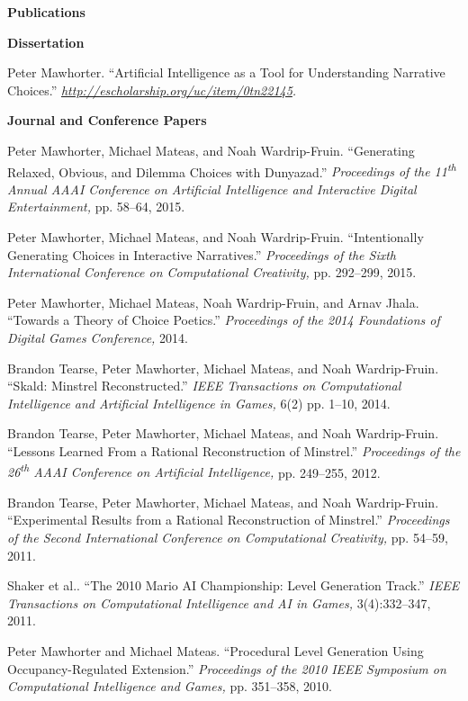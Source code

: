 \documentclass[11pt]{article}
\newenvironment{pubs}[1]{%
  \vspace{8pt}\textbf{\Large #1} \hrulefill\vspace{6pt}
  \begin{adjustwidth}{14pt}{0pt}
  \setlength{\parskip}{4pt}
  \setlength{\parindent}{-8pt}
}{%
  \end{adjustwidth}
}
\newcommand{\pub}[3]{#1. ``#2.'' \textit{#3.}}
\newcommand{\fullpub}[5]{#1. ``#2.'' \textit{#3,} #4, #5.}
\newcommand{\nppub}[4]{#1. ``#2.'' \textit{#3,} #4.}
\newcommand{\heading}[1]{\textbf{\large #1}\vspace{4pt}}
\newcommand{\tsup}[1]{\textsuperscript{#1}}
\begin{document}
\begin{pubs}{Publications}

\hspace{-8pt}\heading{Dissertation}

\pub{Peter Mawhorter}{Artificial Intelligence as a Tool for Understanding Narrative Choices}{\hfill\break\url{http://escholarship.org/uc/item/0tn22145}}

\vspace{6pt}
\heading{Journal and Conference Papers}

\fullpub{Peter Mawhorter, Michael Mateas, and Noah Wardrip-Fruin}{Generating Relaxed, Obvious, and Dilemma Choices with Dunyazad}{Proceedings of the 11\tsup{th} Annual AAAI Conference on Artificial Intelligence and Interactive Digital Entertainment}{pp. 58--64}{2015}

\fullpub{Peter Mawhorter, Michael Mateas, and Noah Wardrip-Fruin}{Intentionally Generating Choices in Interactive Narratives}{Proceedings of the Sixth International Conference on Computational Creativity}{pp. 292--299}{2015}

\nppub{Peter Mawhorter, Michael Mateas, Noah Wardrip-Fruin, and Arnav Jhala}{Towards a Theory of Choice Poetics}{Proceedings of the 2014 Foundations of Digital Games Conference}{2014}

\fullpub{Brandon Tearse, Peter Mawhorter, Michael Mateas, and Noah Wardrip-Fruin}{Skald: Minstrel Reconstructed}{IEEE Transactions on Computational Intelligence and Artificial Intelligence in Games}{6(2) pp. 1--10}{2014}

\fullpub{Brandon Tearse, Peter Mawhorter, Michael Mateas, and Noah Wardrip-Fruin}{Lessons Learned From a Rational Reconstruction of Minstrel}{Proceedings of the 26\tsup{th} AAAI Conference on Artificial Intelligence}{pp. 249--255}{2012}

\fullpub{Brandon Tearse, Peter Mawhorter, Michael Mateas, and Noah Wardrip-Fruin}{Experimental Results from a Rational Reconstruction of Minstrel}{Proceedings of the Second International Conference on Computational Creativity}{pp. 54--59}{2011}

\fullpub{Shaker et al.}{The 2010 Mario AI Championship: Level Generation Track}{IEEE Transactions on Computational Intelligence and AI in Games}{3(4):332--347}{2011}

\fullpub{Peter Mawhorter and Michael Mateas}{Procedural Level Generation Using Occupancy-Regulated Extension}{Proceedings of the 2010 IEEE Symposium on Computational Intelligence and Games}{pp. 351--358}{2010}


\end{pubs}
\end{document}
